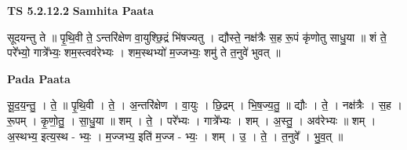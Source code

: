 \documentclass[17pt]{extarticle}
\begin{document}
\textbf{TS 5.2.12.2 } \newline
\textbf{Samhita Paata} \newline

सूदयन्तु ते ॥ पृ॒थि॒वी ते॒ ऽन्तरि॑क्षेण वा॒युश्छि॒द्रं भि॑षज्यतु । द्यौस्ते॒ नक्ष॑त्रैः स॒ह रू॒पं कृ॑णोतु साधु॒या ॥ शं ते॒ परे᳚भ्यो॒ गात्रे᳚भ्यः॒ शम॒स्त्वव॑रेभ्यः । शम॒स्थभ्यो॑ म॒ज्जभ्यः॒ शमु॑ ते त॒नुवे॑ भुवत् ॥ \newline

\textbf{Pada Paata} \newline

सू॒द॒य॒न्तु॒ । ते॒ ॥ पृ॒थि॒वी । ते॒ । अ॒न्तरि॑क्षेण । वा॒युः । छि॒द्रम् । भि॒ष॒ज्य॒तु॒ ॥ द्यौः । ते॒ । नक्ष॑त्रैः । स॒ह । रू॒पम् । कृ॒णो॒तु॒ । सा॒धु॒या ॥ शम् । ते॒ । परे᳚भ्यः । गात्रे᳚भ्यः । शम् । अ॒स्तु॒ । अव॑रेभ्यः ॥ शम् । अ॒स्थभ्य॒ इत्य॒स्थ - भ्यः॒ । म॒ज्जभ्य॒ इति॑ म॒ज्ज - भ्यः॒ । शम् । उ॒ । ते॒ । त॒नुवे᳚ । भु॒व॒त् ॥  \newline
\end{document}
